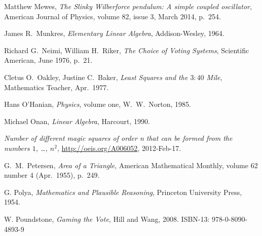 \begin{thebibliography}{\makebox[2em][c]{{}\hfil{}}}
  Matthew Mewes,
  \emph{The Slinky Wilberforce pendulum: A simple coupled oscillator},
  American Journal of Physics,
  volume 82, issue 3, March 2014,
  p.~254.

  James R.\ Munkres,
  \emph{Elementary Linear Algebra},
  Addison-Wesley,
  1964.

  Richard G.~Neimi, William H.~Riker,
  \emph{The Choice of Voting Systems},
  Scientific American,
  June 1976,
  p.~21.



  Cletus O.\ Oakley, Justine C.\ Baker,
  \emph{Least Squares and the $3:40$ Mile},
  Mathematics Teacher,
  Apr.\ 1977.

  Hans O'Hanian,
  \emph{Physics},
  volume one,
  W.\ W.\ Norton,
  1985.

  Michael Onan,
  \emph{Linear Algebra},
  Harcourt,
  1990.

  \emph{Number of different magic squares of order n that can be formed from the numbers $1$, \ldots, $n^2$},
  \url{http://oeis.org/A006052},
  2012-Feb-17.

  G.\ M.\ Petersen,
  \emph{Area of a Triangle},
  American Mathematical Monthly,
  volume 62 number 4 (Apr.\ 1955),
  p.~249.

  G. Polya,
  \emph{Mathematics and Plausible Reasoning},
  Princeton University Press,
  1954.

  W. Poundstone,
  \emph{Gaming the Vote},
  Hill and Wang, 2008.
  ISBN-13: 978-0-8090-4893-9 




\end{thebibliography}
